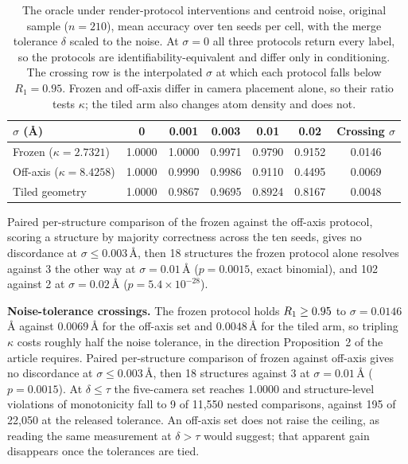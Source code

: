 \begin{table}[htbp]
\centering
\caption{The oracle under render-protocol interventions and centroid noise, original sample ($n = 210$),
mean accuracy over ten seeds per cell, with the merge tolerance $\delta$ scaled to the noise. At
$\sigma = 0$ all three protocols return every label, so the protocols are identifiability-equivalent and
differ only in conditioning. The crossing row is the interpolated $\sigma$ at which each protocol falls below
$R_1 = 0.95$. Frozen and off-axis differ in camera placement alone, so their ratio tests $\kappa$; the tiled
arm also changes atom density and does not.}
\label{tab:conventions}
\small
\setlength{\tabcolsep}{6pt}
\begin{tabular}{@{}l S[table-format=1.4] S[table-format=1.4] S[table-format=1.4] S[table-format=1.4] S[table-format=1.4] S[table-format=1.4]@{}}
\toprule
$\sigma$ (\AA{}) & {0} & {0.001} & {0.003} & {0.01} & {0.02} & {Crossing $\sigma$} \\
\midrule
Frozen ($\kappa = 2.7321$)   & 1.0000 & 1.0000 & 0.9971 & 0.9790 & 0.9152 & 0.0146 \\
Off-axis ($\kappa = 8.4258$) & 1.0000 & 0.9990 & 0.9986 & 0.9110 & 0.4495 & 0.0069 \\
Tiled geometry               & 1.0000 & 0.9867 & 0.9695 & 0.8924 & 0.8167 & 0.0048 \\
\bottomrule
\end{tabular}
\end{table}

Paired per-structure comparison of the frozen against the off-axis protocol, scoring a structure by majority
correctness across the ten seeds, gives no discordance at $\sigma \le 0.003$\,\AA{}, then 18 structures the
frozen protocol alone resolves against 3 the other way at $\sigma = 0.01$\,\AA{} ($p = 0.0015$, exact
binomial), and 102 against 2 at $\sigma = 0.02$\,\AA{} ($p = 5.4\times10^{-28}$).

\textbf{Noise-tolerance crossings.} The frozen protocol holds $R_1 \ge 0.95$ to $\sigma = 0.0146$\,\AA{}
against $0.0069$\,\AA{} for the off-axis set and $0.0048$\,\AA{} for the tiled arm, so tripling $\kappa$ costs
roughly half the noise tolerance, in the direction Proposition~2 of the article requires. Paired
per-structure comparison of frozen against off-axis gives no discordance at $\sigma \le 0.003$\,\AA{}, then 18
structures against 3 at $\sigma = 0.01$\,\AA{} ($p = 0.0015$). At $\delta \le \tau$ the five-camera set reaches
1.0000 and structure-level violations of monotonicity fall to 9 of 11{,}550 nested comparisons, against 195 of
22{,}050 at the released tolerance. An off-axis set does not raise the ceiling, as reading the same
measurement at $\delta > \tau$ would suggest; that apparent gain disappears once the tolerances are tied.

